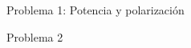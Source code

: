 \documentclass[a4,11pt]{aleph-notas} \usepackage{aleph-moodle} \usepackage{aleph-comandos}
\begin{document}
\encabezado
\begin{problema}{Problema 1: Potencia y polarización}

\end{problema}

\begin{desarrollo}

\end{desarrollo}








\begin{problema}{Problema 2}

\end{problema}

\begin{desarrollo}


\end{desarrollo}
\end{document}
